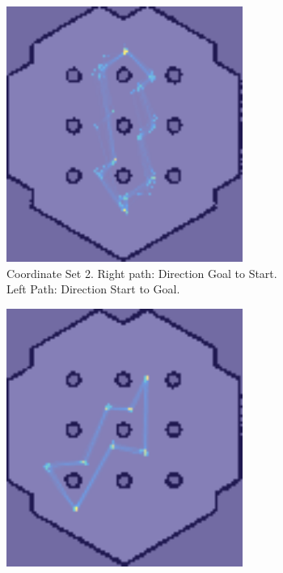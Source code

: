\documentclass[%
paper=A4,               %
twoside=true,           %
openright,              %
11pt,                   %
bibliography=totoc,     %
titlepage=on,           %
DIV=12,                 %
BCOR=1.5cm,             %
parskip=half,            %
final
]{scrreprt}
\begin{document}
\begin{figure}[H]
\begin{subfigure}[b]{0.45\textwidth}
			\includegraphics[width=0.85\textwidth]{Graphics/heatmapCustomSet2.png}
			\caption{Coordinate Set 2. Right path: Direction Goal to Start. Left Path: Direction Start to Goal.}
			\label{fig:fig18}
		\end{subfigure}
		\vfill
			\begin{subfigure}[b]{0.45\textwidth}
			\centering
			\includegraphics[width=0.85\textwidth]{Graphics/heatmapCustomSet3.png}

\end{subfigure}
\end{figure}
\end{document}
